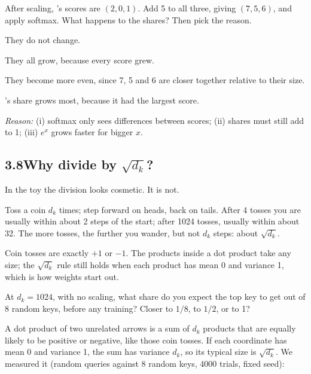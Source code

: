\begin{checkq}
After scaling, 's scores are $(2, 0, 1)$. Add 5 to all three, giving $(7, 5, 6)$, and apply softmax. What
happens to the shares? Then pick the reason.
\begin{options}
\item They do not change.
\item They all grow, because every score grew.
\item They become more even, since 7, 5 and 6 are closer together relative to their size.
\item {}'s share grows most, because it had the largest score.
\end{options}
\emph{Reason:} (i) softmax only sees differences between scores; (ii) shares must still add to 1; (iii) $e^x$
grows faster for bigger $x$.
\end{checkq}


\subsection*{3.8\quad Why divide by $\sqrt{d_k}$?}

In the toy the division looks cosmetic. It is not.

\Picture Toss a coin $d_k$ times; step forward on heads, back on tails. After 4 tosses you are usually within
about 2 steps of the start; after 1024 tosses, usually within about 32. The more tosses, the further you wander,
but not $d_k$ steps: about $\sqrt{d_k}$.

\begin{breaks}
Coin tosses are exactly $+1$ or $-1$. The products inside a dot product take any size; the $\sqrt{d_k}$ rule still
holds when each product has mean 0 and variance 1, which is how weights start out.
\end{breaks}

\Predict At $d_k=1024$, with no scaling, what share do you expect the top key to get out of 8 random keys, before
any training? Closer to $1/8$, to $1/2$, or to 1?

\Exactly A dot product of two unrelated arrows is a sum of $d_k$ products that are equally likely to be positive or
negative, like those coin tosses. If each coordinate has mean 0 and variance 1, the sum has variance $d_k$, so its
typical size is $\sqrt{d_k}$. We measured it (random queries against 8 random keys, 4000 trials, fixed seed):

